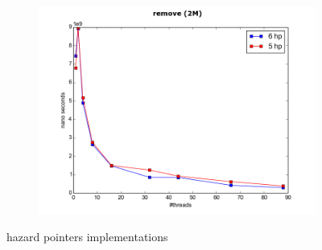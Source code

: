 \documentclass[conference]{IEEEtran}
\begin{document}
\begin{figure}
\begin{subfigure}{.5\textwidth}
			\includegraphics[width=0.45\paperwidth]{hp_comapre/remove_2M.png}
			\label{fig:hp_remove}
		\end{subfigure}
		\caption{hazard pointers implementations}
		\label{fig:hazard_pointers_implementations}
	\end{figure}
\end{document}
